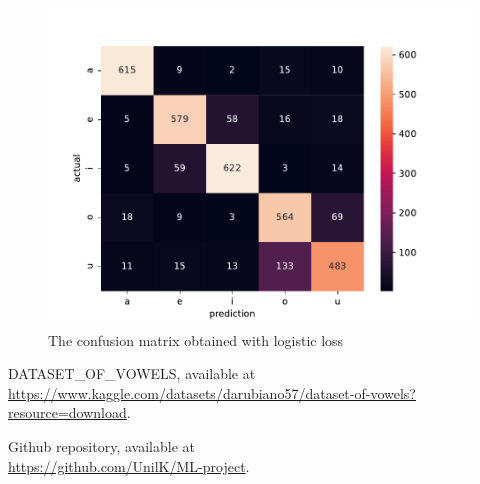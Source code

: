 \documentclass[letterpaper,12pt]{article}
\begin{document}
\begin{figure}
    \centering
    \includegraphics[scale = 0.8]{logistic_confusion.pdf}
    \caption{The confusion matrix obtained with logistic loss}
    \label{fig:figconfusion}
\end{figure}
\begin{thebibliography}{99}
 DATASET\_OF\_VOWELS, available at \\ \href{https://www.kaggle.com/datasets/darubiano57/dataset-of-vowels?resource=download}{https://www.kaggle.com/datasets/darubiano57/dataset-of-vowels?resource=download}.

 Github repository, available at \\\href{https://github.com/UnilK/ML-project}{https://github.com/UnilK/ML-project}.
\end{thebibliography}
\end{document}
